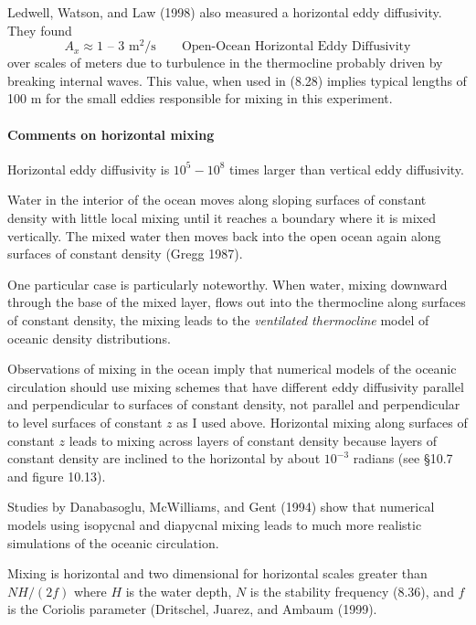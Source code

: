 Ledwell, Watson, and Law (1998) also measured a horizontal eddy
diffusivity. They found
\begin{equation}
A_x \approx 1 \text{ -- } 3 \text{ m$^2$/s} \qquad \text{Open-Ocean Horizontal
Eddy Diffusivity}
\end{equation}
over scales of meters due to turbulence in the
thermocline probably driven by breaking
internal waves. This value, when used in (8.28) implies typical
lengths of 100 m for the small eddies responsible for mixing in this
experiment.

\paragraph{Comments on horizontal mixing}

\begin{enumerate}
\vitem Horizontal eddy diffusivity is $10^5 - 10^8$ times larger than
vertical eddy diffusivity.

\vitem {}Water in the interior of the ocean
moves along sloping surfaces of constant density with little local
mixing until it reaches a boundary where it is mixed vertically. The
mixed water then moves back into the open ocean again along surfaces
of constant density (Gregg 1987).

One particular case is particularly noteworthy. When water, mixing
downward through the base of the mixed layer, flows out into the thermocline along surfaces of
constant density, the mixing leads to the \textit{ventilated
  thermocline} model of oceanic
density distributions.

\vitem Observations of mixing in the ocean imply that numerical models
of the oceanic circulation should use mixing schemes that have
different eddy diffusivity parallel and perpendicular to surfaces of
constant density, not parallel and perpendicular to level
surfaces of constant $z$ as I used
above. Horizontal mixing along surfaces of constant $z$ leads to
mixing across layers of constant density because layers of constant
density are inclined to the horizontal by about $10^{-3}$ radians (see
\S10.7 and figure 10.13).

Studies by Danabasoglu, McWilliams, and Gent (1994) show that
numerical models using isopycnal and diapycnal
mixing leads to much
more realistic simulations of the oceanic circulation.

\vitem Mixing is horizontal and two dimensional for horizontal scales
greater than $NH/(2f)$ where $H$ is the water depth, $N$ is the
stability frequency (8.36), and $f$ is the
Coriolis parameter (Dritschel, Juarez, and Ambaum (1999).
\end{enumerate}
\vspace{-2ex}

